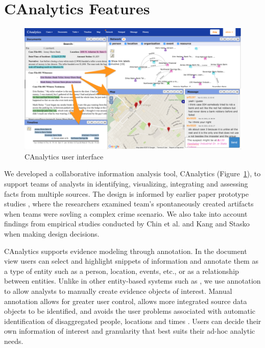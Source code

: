 \section{CAnalytics Features}\label{canalytics-features}

\begin{figure}
	\centering
    \label{fig:interface}
	\includegraphics{./img/interface.png}
	\caption{CAnalytics user interface}
\end{figure}

We developed a collaborative information analysis tool, CAnalytics
(Figure~\ref{fig:interface}), to support teams of analysts in identifying,
visualizing, integrating and assessing facts from multiple sources. The design
is informed by earlier paper prototype studies \autocite{Carroll2013}, where the
researchers examined team's spontaneously created
artifacts when teams were sovling a complex crime scenario. We also take into
account findings from empirical studies conducted by Chin et al.
\autocite{Chin2009} and Kang and Stasko \autocite{Kang2011} when making design
decisions.

CAnalytics supports evidence modeling through annotation. In the document view
users can select and highlight snippets of information and annotate them as a
type of entity such as a person, location, events, etc., or as a relationship
between entities. Unlike in other entity-based systems such as
\autocites{Bier2010}{Stasko2008}, we use annotation to allow analysts to
manually create evidence objects of interest.  Manual annotation allows for
greater user control, allows more integrated source data objects to be
identified, and avoids the user problems associated with automatic
identification of disaggregated people, locations and times \autocite{Bier2008}.
Users can decide their own information of interest and granularity that best
suits their ad-hoc analytic needs.

